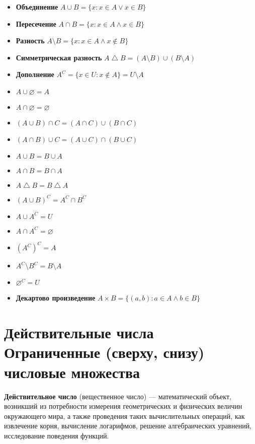 \begin{itemize}
    \setlength\itemsep{-0.2em}
    \item \textbf{Объединение} $A \cup B = \{x: x \in A \vee x \in B\}$
    \item \textbf{Пересечение} $A \cap B = \{x: x \in A \wedge x \in B\}$
    \item \textbf{Разность} $A \setminus B = \{x: x \in A \wedge x \notin B\}$
    \item \textbf{Симметрическая разность} $A \bigtriangleup B = (A \setminus B) \cup (B \setminus A)$
    \item \textbf{Дополнение} $A^C = \{x \in U : x \notin A\} = U \setminus A$
    \item $A \cup \varnothing = A$
    \item $A \cap \varnothing = \varnothing$
    \item $(A \cup B) \cap C = (A \cap C) \cup (B \cap C)$
    \item $(A \cap B) \cup C = (A \cup C) \cap (B \cup C)$
    \item $A \cup B = B \cup A$
    \item $A \cap B = B \cap A$
    \item $A \bigtriangleup B = B \bigtriangleup A$
    \item $(A \cup B)^C = A^C \cap B^C$
    \item $A \cup A^C = U$
    \item $A \cap A^C = \varnothing$
    \item ${(A^C)}^C = A$
    \item $A^C \setminus B^C = B \setminus A$
    \item $\varnothing^C = U$
    \item \textbf{Декартово произведение} $A \times B = \{(a, b) : a \in A \wedge b \in B\}$
\end{itemize}

\section{Действительные числа\\ {\normalfont Ограниченные (сверху, снизу) числовые множества}}

\textbf{Действительное число} (вещественное число) — математический объект, возникший из потребности измерения геометрических и физических величин окружающего мира, а также проведения таких вычислительных операций, как извлечение корня, вычисление логарифмов, решение алгебраических уравнений, исследование поведения функций.

